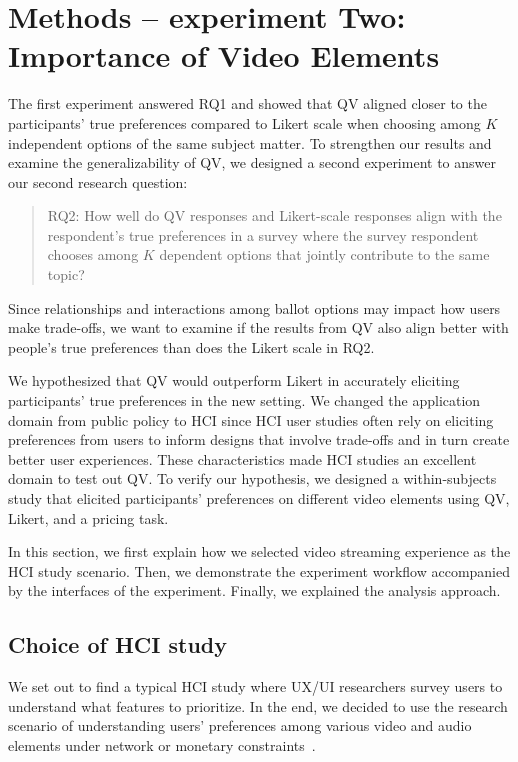 \section{Methods -- experiment Two: Importance of Video Elements}
\label{method-2}
The first experiment answered RQ1 and showed that QV aligned closer to the participants' true preferences compared to Likert scale when choosing among $K$ independent options of the same subject matter. To strengthen our results and examine the generalizability of QV, we designed a second experiment to answer our second research question: \begin{quote}RQ2: How well do QV responses and Likert-scale responses align with the respondent's true preferences in a survey where the survey respondent chooses among $K$ dependent options that jointly contribute to the same topic?\end{quote} 
Since relationships and interactions among ballot options may impact how users make trade-offs, we want to examine if the results from QV also align better with people's true preferences than does the Likert scale in RQ2.

We hypothesized that QV would outperform Likert in accurately eliciting participants' true preferences in the new setting. We changed the application domain from public policy to HCI {} since HCI user studies often rely on eliciting preferences from users to inform designs that involve trade-offs and in turn create better user experiences. These characteristics made HCI studies an excellent domain to test out QV. To verify our hypothesis, we designed a within-subjects study that elicited participants' preferences on different video elements using QV, Likert, and a pricing task. 

In this section, we first explain how we selected video streaming experience as the HCI study scenario. Then, we demonstrate the experiment workflow accompanied by the interfaces of the experiment. Finally, we explained the analysis approach.

\subsection{Choice of HCI study} \label{exp2-hci}
We set out to find a typical HCI study where UX/UI researchers survey users to understand what features to prioritize. In the end, we decided to use the research scenario of understanding users' preferences among various video and audio elements under network or monetary constraints~\cite{molnar2013comedy, oeldorf2012bad}.

